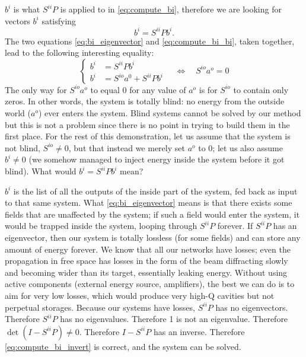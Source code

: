 $b^i$ is what $S^{ii}P$ is applied to in \cref{eq:compute_bi}, therefore we are looking for vectors $b^i$ satisfying
\begin{equation}
    b^i = S^{ii}P b^i \text{.} \label{eq:bi_eigenvector}
\end{equation}
The two equations \cref{eq:bi_eigenvector} and  \cref{eq:compute_bi_bi}, taken together, 
lead to the following interesting equality:
\begin{equation}
    \left\lbrace
        \begin{aligned}
            b^i &= S^{ii}P b^i \\
            b^i &= S^{io}a^0 + S^{ii}P b^i
        \end{aligned}
    \right.
    \quad
    \Longleftrightarrow
    \quad
    S^{io}a^o = 0
\end{equation}
The only way for $S^{io}a^o$ to equal 0 for any value of $a^o$ is for $S^{io}$ to contain only zeros.
In other words, the system is totally blind: no energy from the outside world ($a^o$) ever enters the system.
Blind systems cannot be solved by our method but this is not a problem since there is no point in trying to build them in the first place.
For the rest of this demonstration, let us assume that the system is not blind, $S^{io}\neq 0$, but that instead we merely set $a^o$ to 0; let us also assume $b^i \neq 0$ (we somehow managed to inject energy inside the system before it got blind).
What would $b^i = S^{ii}P b^i$ mean?

$b^i$ is the list of all the outputs of the inside part of the system, fed back as input to that same system.
What \cref{eq:bi_eigenvector} means is that there exists some fields that are unaffected by the system; if such a field would enter the system, it would be trapped inside the system, looping through $S^{ii}P$ forever.
If $S^{ii}P$ has an eigenvector, then our system is totally lossless (for some fields) and can store any amount of energy forever.
We know that all our networks have losses; even the propagation in free space has losses in the form of the beam diffracting slowly and becoming wider than its target, essentially leaking energy.
Without using active components (external energy source, amplifiers), the best we can do is to aim for very low losses, which would produce very high-Q cavities but not perpetual storages.
Because our systems have losses, $S^{ii}P$ has no eigenvectors.
Therefore $S^{ii}P$ has no eigenvalues.
Therefore 1 is not an eigenvalue.
Therefore $\det(I-S^{ii}P) \neq 0$.
Therefore $I-S^{ii}P$ has an inverse.
Therefore \cref{eq:compute_bi_invert} is correct, and the system can be solved.

